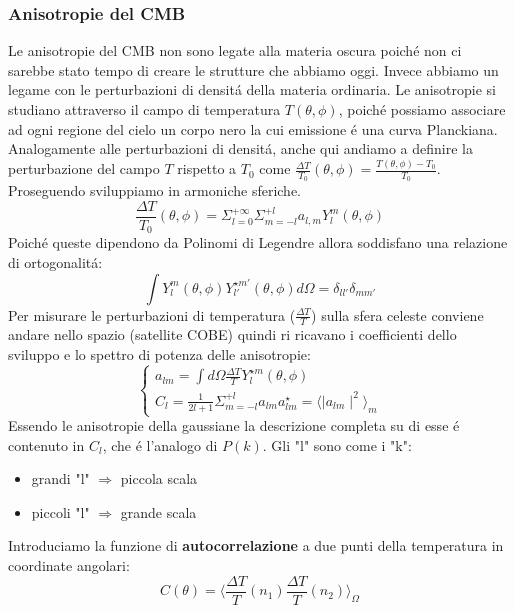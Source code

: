 \documentclass[12pt, a4paper]{article}
\begin{document}
\subsubsection{Anisotropie del CMB}
Le anisotropie del CMB non sono legate alla materia oscura poich\'{e} non ci sarebbe stato tempo di creare le strutture che abbiamo oggi. Invece abbiamo un legame con le perturbazioni di densit\'{a} della materia ordinaria. Le anisotropie si studiano attraverso il campo di temperatura $T(\theta, \phi)$, poich\'{e} possiamo associare ad ogni regione del cielo un corpo nero la cui emissione \'{e} una curva Planckiana. Analogamente alle perturbazioni di densit\'{a}, anche qui andiamo a definire la perturbazione del campo $T$ rispetto a $T_0$ come $\frac{\Delta T}{T_0}(\theta ,\phi)=\frac{T(\theta,\phi)-T_0}{T_0}$. Proseguendo sviluppiamo in armoniche sferiche.
\begin{equation}
\frac{\Delta T}{T_0}(\theta ,\phi)=\Sigma_{l=0}^{+\infty}\Sigma_{m=-l}^{+l}a_{l,m}Y_l^m(\theta,\phi)
\end{equation}
Poich\'{e} queste dipendono da Polinomi di Legendre allora soddisfano una relazione di ortogonalit\'{a}:
\begin{equation}
\int  Y_l^m(\theta,\phi)Y_{l'}^{\star m'}(\theta,\phi)d\Omega=\delta_{ll'}\delta_{mm'}
\end{equation}
Per misurare le perturbazioni di temperatura ($\frac{\Delta T}{T}$) sulla sfera celeste conviene andare nello spazio (satellite COBE) quindi ri ricavano i coefficienti dello sviluppo e lo spettro di potenza delle anisotropie:
\begin{equation}
\begin{cases}
a_{lm}=\int d\Omega \frac{\Delta T}{T}Y_l^{\star m}(\theta,\phi)
\\
C_l =\frac{1}{2l+1} \Sigma_{m=-l}^{+l} a_{lm} a_{lm}^{\star}=\langle \mid a_{lm}\mid^2\rangle_m
\end{cases}
\end{equation}
Essendo le anisotropie della gaussiane la descrizione completa su di esse \'{e} contenuto in $C_l$, che \'{e} l'analogo di $P(k)$. Gli "l" sono come i "k":
\begin{itemize}
\item grandi "l" $\Rightarrow$ piccola scala
\item piccoli "l" $\Rightarrow$ grande scala
\end{itemize}
Introduciamo la funzione di \textbf{autocorrelazione} a due punti della temperatura in coordinate angolari:
\begin{equation}
C(\theta)=\langle\frac{\Delta T}{T}(n_1) \frac{\Delta T}{T}(n_2) \rangle_{\Omega}  
\end{equation}
\end{document}
